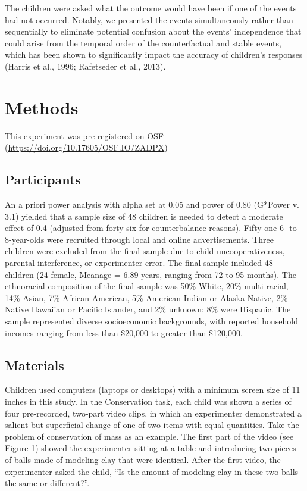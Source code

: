 \documentclass[
  doc]{apa6}
\begin{document}
The children were asked what the outcome would have been if one of the events had not occurred.
Notably, we presented the events simultaneously rather than sequentially to eliminate potential confusion about the events' independence that could arise from the temporal order of the counterfactual and stable events, which has been shown to significantly impact the accuracy of children's responses (Harris et al., 1996; Rafetseder et al., 2013).

\section{Methods}\label{methods}

This experiment was pre-registered on OSF (\url{https://doi.org/10.17605/OSF.IO/ZADPX})

\subsection{Participants}\label{participants}

An a priori power analysis with alpha set at 0.05 and power of 0.80 (G*Power v. 3.1) yielded that a sample size of 48 children is needed to detect a moderate effect of 0.4 (adjusted from forty-six for counterbalance reasons).
Fifty-one 6- to 8-year-olds were recruited through local and online advertisements.
Three children were excluded from the final sample due to child uncooperativeness, parental interference, or experimenter error.
The final sample included 48 children (24 female, Meanage = 6.89 years, ranging from 72 to 95 months).
The ethnoracial composition of the final sample was 50\% White, 20\% multi-racial, 14\% Asian, 7\% African American, 5\% American Indian or Alaska Native, 2\% Native Hawaiian or Pacific Islander, and 2\% unknown; 8\% were Hispanic.
The sample represented diverse socioeconomic backgrounds, with reported household incomes ranging from less than \$20,000 to greater than \$120,000.

\subsection{Materials}\label{materials}

Children used computers (laptops or desktops) with a minimum screen size of 11 inches in this study. In the Conservation task, each child was shown a series of four pre-recorded, two-part video clips, in which an experimenter demonstrated a salient but superficial change of one of two items with equal quantities. Take the problem of conservation of mass as an example.
The first part of the video (see Figure 1) showed the experimenter sitting at a table and introducing two pieces of balls made of modeling clay that were identical. After the first video, the experimenter asked the child, ``Is the amount of modeling clay in these two balls the same or different?''.
\end{document}
